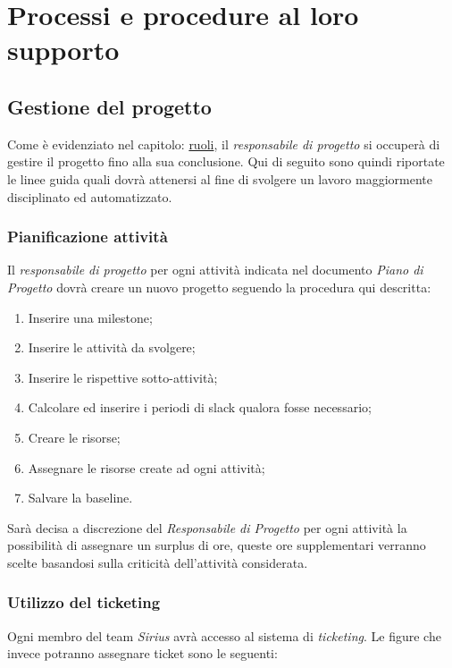 \section{Processi e procedure al loro supporto}
\subsection{Gestione del progetto}
Come è evidenziato nel capitolo: \hyperref[referenzaRDP]{ruoli}, il \textit{responsabile di progetto} si occuperà di gestire il progetto fino alla sua conclusione. Qui di seguito sono quindi riportate le linee guida quali dovrà attenersi al fine di svolgere un lavoro maggiormente disciplinato ed automatizzato.

\subsubsection{Pianificazione attività}

Il \textit{responsabile di progetto} per ogni attività indicata nel documento \textit{Piano di Progetto} dovrà creare un nuovo progetto seguendo la procedura qui descritta:

\begin{enumerate}
\item Inserire una milestone;
\item Inserire le attività da svolgere;
\item Inserire le rispettive sotto-attività;
\item Calcolare ed inserire i periodi di slack qualora fosse necessario;
\item Creare le risorse;
\item Assegnare le risorse create ad ogni attività;
\item Salvare la baseline.
\end{enumerate}

Sarà decisa a discrezione del \textit{Responsabile di Progetto} per ogni attività la possibilità di assegnare un surplus di ore, queste ore supplementari verranno scelte basandosi sulla criticità dell'attività considerata. 
	
\subsubsection{Utilizzo del ticketing}
Ogni membro del team \textit{Sirius} avrà accesso al sistema di \textit{ticketing}. Le figure che invece potranno assegnare ticket sono le seguenti:

